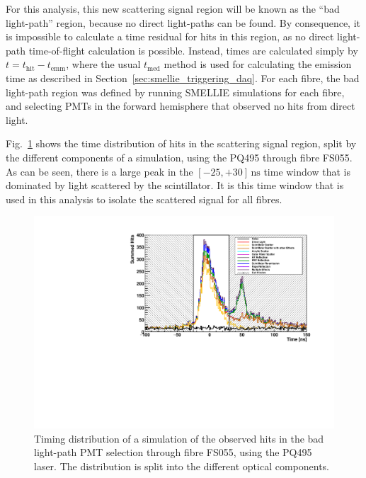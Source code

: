 For this analysis, this new scattering signal region will be known as the ``bad light-path'' region, because no direct light-paths can be found. By consequence, it is impossible to calculate a time residual for hits in this region, as no direct light-path time-of-flight calculation is possible. Instead, times are calculated simply by $t = t_{\mathrm{hit}}-t_{\mathrm{emm}}$, where the usual $t_{\mathrm{med}}$ method is used for calculating the emission time as described in Section~\ref{sec:smellie_triggering_daq}. For each fibre, the bad light-path region was defined by running SMELLIE simulations for each fibre, and selecting PMTs in the forward hemisphere that observed no hits from direct light.

Fig.~\ref{fig:smellie_bad_lightpath_region_tracked} shows the time distribution of hits in the scattering signal region, split by the different components of a simulation, using the PQ495 through fibre FS055. As can be seen, there is a large peak in the $[-25,+30]\,\si{\ns}$ time window that is dominated by light scattered by the scintillator. It is this time window that is used in this analysis to isolate the scattered signal for all fibres. 

\begin{figure}[!th]
    \centering
    \includegraphics[width=\textwidth]{5_SMELLIEAnalysis/images/bad_lightpaths_components_plot_FS055_PQ495_Jul2022_w_window.pdf}
    \caption[Timing distribution of a simulation of the observed hits in the bad light-path PMT selection, split by optical components]
    {Timing distribution of a simulation of the observed hits in the bad light-path PMT selection through fibre FS055, using the PQ495 laser. The distribution is split into the different optical components.}
    \label{fig:smellie_bad_lightpath_region_tracked}
\end{figure}

